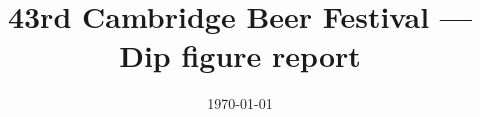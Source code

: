 \documentclass{article}
\begin{document}
\selectfont  %


\normalem
\title{43rd Cambridge Beer Festival --- Dip figure report}
\author{}
\date{\today}
\maketitle

\end{document}
